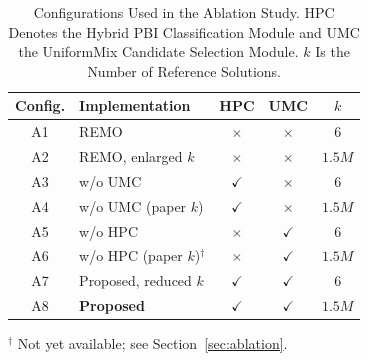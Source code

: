 
\begin{table}[!t]
\centering
\caption{Configurations Used in the Ablation Study. HPC Denotes the
Hybrid PBI Classification Module and UMC the UniformMix Candidate
Selection Module. $k$ Is the Number of Reference Solutions.}
\label{tab:abl_config}
\renewcommand{\arraystretch}{1.15}
\setlength{\tabcolsep}{4pt}
\begin{tabular}{clccc}
\toprule
Config. & Implementation & HPC & UMC & $k$ \\
\midrule
A1 & REMO \cite{hao2022remo}            & $\times$    & $\times$    & $6$        \\
A2 & REMO, enlarged $k$                  & $\times$    & $\times$    & $1.5M$     \\
A3 & w/o UMC                             & $\checkmark$& $\times$    & $6$        \\
A4 & w/o UMC (paper $k$)                 & $\checkmark$& $\times$    & $1.5M$     \\
A5 & w/o HPC                             & $\times$    & $\checkmark$& $6$        \\
A6 & w/o HPC (paper $k$)$^{\dagger}$    & $\times$    & $\checkmark$& $1.5M$     \\
A7 & Proposed, reduced $k$               & $\checkmark$& $\checkmark$& $6$        \\
A8 & \textbf{Proposed}                   & $\checkmark$& $\checkmark$& $1.5M$     \\
\bottomrule
\end{tabular}
\begin{flushleft}
\footnotesize $^{\dagger}$ Not yet available; see Section~\ref{sec:ablation}.
\end{flushleft}
\end{table}

